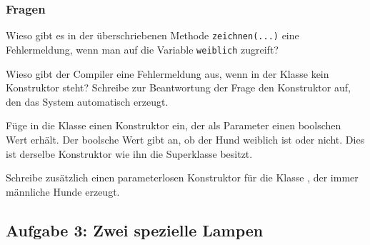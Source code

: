 \subsubsection{Fragen}

\begin{compactenum}[a)]
\item Wieso gibt es in der überschriebenen Methode \verb|zeichnen(...)| eine
Fehlermeldung, wenn man auf die Variable \verb|weiblich| zugreift?

\item Wieso gibt der Compiler eine Fehlermeldung aus, wenn in der Klasse
 kein Konstruktor steht? Schreibe zur Beantwortung der Frage den
Konstruktor auf, den das System automatisch erzeugt.

\item Füge in die Klasse  einen Konstruktor ein, der als Parameter
einen boolschen Wert erhält. Der boolsche Wert gibt an, ob der Hund weiblich ist
oder nicht. Dies ist derselbe Konstruktor wie ihn die Superklasse 
besitzt.

\item Schreibe zusätzlich einen parameterlosen Konstruktor für die Klasse
, der immer männliche Hunde erzeugt.
\end{compactenum}


\subsection{Aufgabe 3: Zwei spezielle Lampen}

